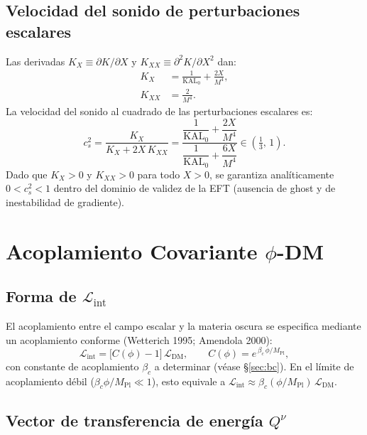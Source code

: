 \documentclass[11pt,a4paper]{article}
\newcommand{\KAL}{\mathrm{KAL}_0}   %
\newcommand{\Mpl}{M_{\mathrm{Pl}}}
\newcommand{\brac}[1]{\left(#1\right)}
\begin{document}
\subsection{Velocidad del sonido de perturbaciones escalares}

Las derivadas $K_X \equiv \partial K/\partial X$ y
$K_{XX} \equiv \partial^2 K/\partial X^2$ dan:
%
\begin{align}
  K_X   &= \frac{1}{\KAL} + \frac{2X}{M^4}, \label{eq:KX_deriv}\\
  K_{XX} &= \frac{2}{M^4}.                   \label{eq:KXX}
\end{align}
%
La velocidad del sonido al cuadrado de las perturbaciones escalares es:
%
\begin{equation}
  c_s^{2} = \frac{K_X}{K_X + 2X\,K_{XX}}
           = \frac{\dfrac{1}{\KAL} + \dfrac{2X}{M^4}}
             {\dfrac{1}{\KAL} + \dfrac{6X}{M^4}}
           \in \brac{\tfrac{1}{3},\,1}.
  \label{eq:cs2}
\end{equation}
%
Dado que $K_X > 0$ y $K_{XX} > 0$ para todo $X>0$, se garantiza
analíticamente $0 < c_s^2 < 1$ dentro del dominio de validez de la EFT
(ausencia de ghost y de inestabilidad de gradiente).

\section{Acoplamiento Covariante \texorpdfstring{$\phi$}{phi}-DM}

\subsection{Forma de \texorpdfstring{$\mathcal{L}_{\mathrm{int}}$}{L\_int}}

El acoplamiento entre el campo escalar y la materia oscura se especifica
mediante un acoplamiento conforme (Wetterich 1995; Amendola 2000):
%
\begin{equation}
  \mathcal{L}_{\mathrm{int}}
  = \bigl[C(\phi) - 1\bigr]\,\mathcal{L}_{\mathrm{DM}},
  \qquad
  C(\phi) = e^{\,\beta_c\,\phi/\Mpl},
  \label{eq:Lint}
\end{equation}
%
con constante de acoplamiento $\beta_c$ a determinar (véase §\ref{sec:bc}).
En el límite de acoplamiento débil ($\beta_c\phi/\Mpl \ll 1$), esto
equivale a $\mathcal{L}_{\mathrm{int}} \approx \beta_c(\phi/\Mpl)\,
\mathcal{L}_{\mathrm{DM}}$.

\subsection{Vector de transferencia de energía \texorpdfstring{$Q^\nu$}{Q^nu}}
\end{document}
